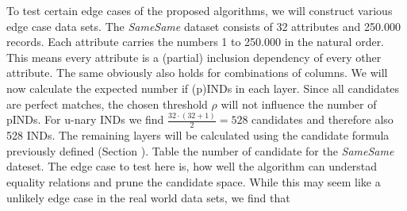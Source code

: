 To test certain edge cases of the proposed algorithms, we will construct various edge case data sets. The \textit{SameSame} dataset consists of 32 attributes and 250.000 records. Each attribute carries the numbers 1 to 250.000 in the natural order. This means every attribute is a (partial) inclusion dependency of every other attribute. The same obviously also holds for combinations of columns. We will now calculate the expected number if (p)INDs in each layer. Since all candidates are perfect matches, the chosen threshold $\rho$ will not influence the number of pINDs. For u-nary INDs we find $\frac{32 \cdot (32 + 1)}{2} = 528$ candidates and therefore also 528 INDs. The remaining layers will be calculated using the candidate formula previously defined (Section %
). Table %
 the number of candidate for the \textit{SameSame} dateset.
The edge case to test here is, how well the algorithm can understad equality relations and prune the candidate space. While this may seem like a unlikely edge case in the real world data sets, we find that

